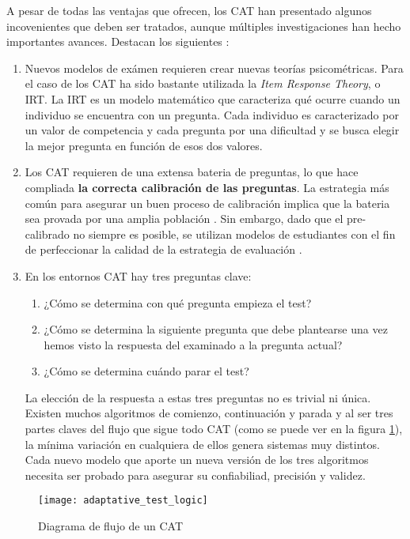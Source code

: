 A pesar de todas las ventajas que ofrecen, los \acrshort{CAT} han presentado algunos incovenientes que deben ser tratados, aunque múltiples investigaciones han hecho importantes avances. Destacan los siguientes \cite{Wainer00}:

\begin{enumerate}
 	\item Nuevos modelos de exámen requieren crear nuevas teorías psicométricas. Para el caso de los \acrshort{CAT} ha sido bastante utilizada la \textit{Item Response Theory}, o \acrshort{IRT}. La \acrshort{IRT} es un modelo matemático que caracteriza qué ocurre cuando un individuo se encuentra con un pregunta. Cada individuo es caracterizado por un valor de competencia y cada pregunta por una dificultad y se busca elegir la mejor pregunta en función de esos dos valores\cite{Wainer83}.
	\item Los \acrshort{CAT} requieren de una extensa bateria de preguntas, lo que hace compliada \textbf{la correcta calibración de las preguntas}. La estrategia más común para asegurar un buen proceso de calibración implica que la bateria sea provada por una amplia población \cite{Klinkenberg11}. Sin embargo, dado que el pre-calibrado no siempre es posible, se utilizan modelos de estudiantes con el fin de perfeccionar la calidad de la estrategia de evaluación \cite{Antal11}\cite{Galvez09}\cite{Molins14Test}.
	\item En los entornos \acrshort{CAT} hay tres preguntas clave:
	\begin{enumerate}
		\item ¿Cómo se determina con qué pregunta empieza el test?
		\item ¿Cómo se determina la siguiente pregunta que debe plantearse una vez hemos visto la respuesta del examinado a la pregunta actual?
		\item ¿Cómo se determina cuándo parar el test?
	\end{enumerate}
	La elección de la respuesta a estas tres preguntas no es trivial ni única. Existen muchos algoritmos de comienzo, continuación y parada y al ser tres partes claves del flujo que sigue todo \acrshort{CAT} (como se puede ver en la figura \ref{fig:diagrama_flujo_CAT}), la mínima variación en cualquiera de ellos genera sistemas muy distintos. Cada nuevo modelo que aporte un nueva versión de los tres algoritmos necesita ser probado para asegurar su confiabiliad, precisión y validez\cite{Wainer00}.
\end{enumerate}

\begin{figure}[htp!]
	\centering
	\texttt{[image: adaptative\_test\_logic]}
	\caption{Diagrama de flujo de un \acrshort{CAT}}
	\label{fig:diagrama_flujo_CAT}
\end{figure}


